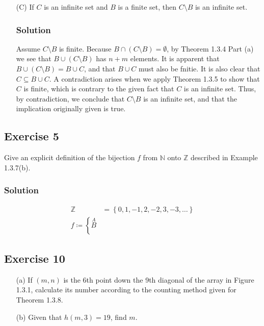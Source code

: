 \documentclass[12pt]{article}
\begin{document}
\begin{itemize}
\item[(C)] If $C$ is an infinite set and $B$ is a finite set, then $C \setminus B$ is an infinite set.
\subsubsection*{Solution}
Assume $C \setminus B$ is finite. Because $B \cap \left(C \setminus B\right) = \emptyset$, by Theorem 1.3.4 Part (a) we see that $B \cup \left(C \setminus B\right)$ has $n + m$ elements. It is apparent that $B \cup \left(C \setminus B\right) = B \cup C$, and that $B \cup C$ must also be fnitie. It is also clear that $C \subseteq B \cup C$. A contradiction arises when we apply Theorem 1.3.5 to show that $C$ is finite, which is contrary to the given fact that $C$ is an infinite set. Thus, by contradiction, we conclude that $C \setminus B$ is an infinite set, and that the implication originally given is true.

\end{itemize}

\subsection*{Exercise 5}
Give an explicit definition of the bijection $f$ from $\mathbb{N}$ onto $\mathbb{Z}$ described in Example 1.3.7(b).
\subsubsection*{Solution}
\begin{align*}
\mathbb{Z} &= \left\{0, 1, -1, 2, -2, 3, -3, \dots\right\} \\
f \coloneqq \left\{\stackrel{A}{B} \right.
\end{align*}
\subsection*{Exercise 10}
\begin{itemize}
\item[(a)] If $\left(m, n\right)$ is the 6th point down the 9th diagonal of the array in Figure 1.3.1, calculate its number according to the counting method given for Theorem 1.3.8.
\item[(b)] Given that $h\left(m, 3\right) = 19$, find $m$.
\end{itemize}
\end{document}
